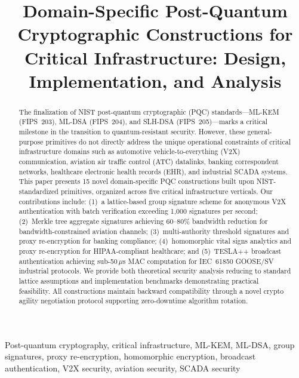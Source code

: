\documentclass[conference,10pt]{IEEEtran}
\begin{document}
\title{Domain-Specific Post-Quantum Cryptographic Constructions for Critical Infrastructure: Design, Implementation, and Analysis}

\author{
}

\maketitle

\begin{abstract}
The finalization of NIST post-quantum cryptographic (PQC) standards---ML-KEM (FIPS~203), ML-DSA (FIPS~204), and SLH-DSA (FIPS~205)---marks a critical milestone in the transition to quantum-resistant security. However, these general-purpose primitives do not directly address the unique operational constraints of critical infrastructure domains such as automotive vehicle-to-everything (V2X) communication, aviation air traffic control (ATC) datalinks, banking correspondent networks, healthcare electronic health records (EHR), and industrial SCADA systems. This paper presents 15 novel domain-specific PQC constructions built upon NIST-standardized primitives, organized across five critical infrastructure verticals. Our contributions include: (1)~a lattice-based group signature scheme for anonymous V2X authentication with batch verification exceeding 1{,}000 signatures per second; (2)~Merkle tree aggregate signatures achieving 60--80\% bandwidth reduction for bandwidth-constrained aviation channels; (3)~multi-authority threshold signatures and proxy re-encryption for banking compliance; (4)~homomorphic vital signs analytics and proxy re-encryption for HIPAA-compliant healthcare; and (5)~TESLA++ broadcast authentication achieving sub-50\,$\mu$s MAC computation for IEC~61850 GOOSE/SV industrial protocols. We provide both theoretical security analysis reducing to standard lattice assumptions and implementation benchmarks demonstrating practical feasibility. All constructions maintain backward compatibility through a novel crypto agility negotiation protocol supporting zero-downtime algorithm rotation.
\end{abstract}

\begin{IEEEkeywords}
Post-quantum cryptography, critical infrastructure, ML-KEM, ML-DSA, group signatures, proxy re-encryption, homomorphic encryption, broadcast authentication, V2X security, aviation security, SCADA security
\end{IEEEkeywords}
\end{document}
